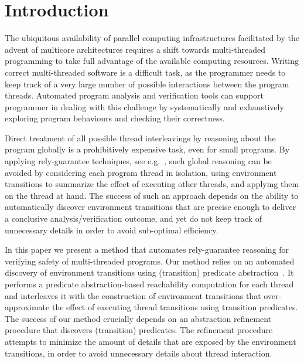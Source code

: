 \section{Introduction}

The ubiquitous availability of parallel computing infrastructures
facilitated by the advent of multicore architectures requires a shift
towards multi-threaded programming to take full advantage of the
available computing resources.
Writing correct multi-threaded software is a difficult task, as the
programmer needs to keep track of a very large number of possible
interactions between the program threads.
Automated program analysis and verification tools can support
programmer in dealing with this challenge by systematically and
exhaustively exploring program behaviours and checking their
correctness.

Direct treatment of all possible thread interleavings by reasoning
about the program globally is a prohibitively expensive task, even for
small programs. 
By applying rely-guarantee techniques, see
e.g.~\cite{RelyGuarantee,OwickiAI76}, such global reasoning can be
avoided by considering each program thread in isolation, using
environment transitions to summarize the effect of executing other
threads, and applying them on the thread at hand.
The success of such an approach depends on the ability to
automatically discover environment transitions that are precise enough
to deliver a conclusive analysis/verification outcome, and yet do not
keep track of unnecessary details in order to avoid sub-optimal
efficiency.

  
In this paper we present a method that automates rely-guarantee
reasoning for verifying safety of multi-threaded programs.
Our method relies on an automated discovery of environment transitions
using (transition) predicate abstraction~\cite{GrafSaidi,TransPred05}.
It performs a predicate abstraction-based reachability computation for
each thread and interleaves it with the construction of environment
transitions that over-approximate the effect of executing thread
transitions using transition predicates.
The success of our method crucially depends on an abstraction
refinement procedure that discovers (transition) predicates.
The refinement procedure attempts to minimize the amount of details
that are exposed by the environment transitions, in order to avoid
unnecessary details about thread interaction.

